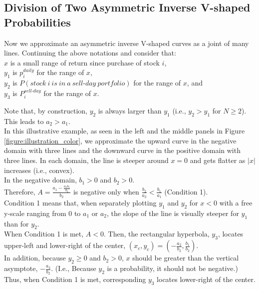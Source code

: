 \documentclass[11pt, a4paper]{article}
\begin{document}
\subsection{Division of Two Asymmetric Inverse V-shaped Probabilities}
\label{section:division_two_inverse_v}

Now we approximate an asymmetric inverse V-shaped curves as a joint of many lines. Continuing the above notations and consider that:\\
$x$ is a small range of return since purchase of stock $i$,\\
$y_1$ is $p^{daily}_{i}$ for the range of $x$,\\
$y_2$ is $P(stock~i~is~in~a~sell\mbox{-}day~portfolio)$ for the range of $x$, and \\
$y_3$ is $P^{sell\mbox{-}day}_{i}$ for the range of $x$. \\
\noindent

Note that, by construction, $y_2$ is always larger than $y_1$ (i.e., $y_2>y_1$ for $N \geq2$). This leads to $a_2>a_1$.\\

\noindent
In this illustrative example, as seen in the left and the middle panels in Figure \ref{figure:illustration_color}, we approximate the upward curve in the negative domain with three lines and the downward curve in the positive domain with three lines. In each domain, the line is steeper around $x=0$ and gets flatter as $|x|$ increases (i.e., convex).\\

\noindent
In the negative domain, $b_1>0$ and $b_2>0$.\\
Therefore, $A = \frac{a_1-\frac{a_2 b_1}{b_2}}{b_2}$ is negative only when $\frac{b_2}{a_2} < \frac{b_1}{a_1}$ (Condition 1).\\
Condition 1 means that, when separately plotting $y_1$ and $y_2$ for $x<0$ with a free y-scale ranging from 0 to $a_1$ or $a_2$, the slope of the line is visually steeper for $y_1$ than for $y_2$.\\

\noindent
When Condition 1 is met, $A<0$. Then, the rectangular hyperbola, $y_3$, locates upper-left and lower-right of the center, $(x_c, y_c) = (-\frac{a_2}{b_2}, \frac{b_1}{b_2})$.\\ 

\noindent
In addition, because $y_2 \geq 0$ and $b_2>0$, $x$ should be greater than the vertical asymptote, $-\frac{a_2}{b_2}$. (I.e., Because $y_2$ is a probability, it should not be negative.) Thus, when Condition 1 is met, corresponding $y_3$ locates lower-right of the center. \\
\end{document}
